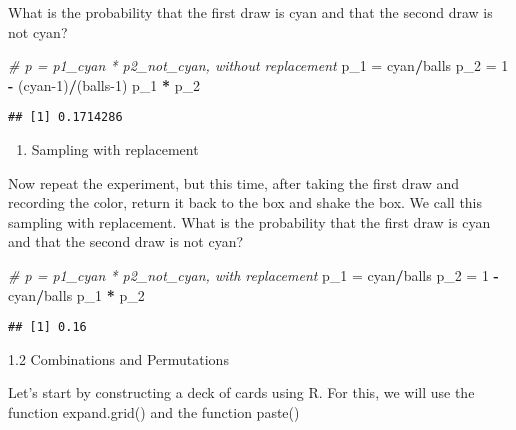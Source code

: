 \documentclass[
]{article}
\newenvironment{Shaded}{\begin{snugshade}}{\end{snugshade}}
\newcommand{\CommentTok}[1]{\textcolor[rgb]{0.56,0.35,0.01}{\textit{#1}}}
\newcommand{\DecValTok}[1]{\textcolor[rgb]{0.00,0.00,0.81}{#1}}
\newcommand{\NormalTok}[1]{#1}
\newcommand{\OperatorTok}[1]{\textcolor[rgb]{0.81,0.36,0.00}{\textbf{#1}}}
\newcommand{\StringTok}[1]{\textcolor[rgb]{0.31,0.60,0.02}{#1}}
\providecommand{\tightlist}{%
  \setlength{\itemsep}{0pt}\setlength{\parskip}{0pt}}
\begin{document}
What is the probability that the first draw is cyan and that the second
draw is not cyan?

\begin{Shaded}
\begin{Highlighting}[]
\CommentTok{# p = p1_cyan * p2_not_cyan, without replacement}
\NormalTok{p_}\DecValTok{1}\NormalTok{ =}\StringTok{ }\NormalTok{cyan}\OperatorTok{/}\NormalTok{balls }
\NormalTok{p_}\DecValTok{2}\NormalTok{ =}\StringTok{ }\DecValTok{1} \OperatorTok{-}\StringTok{ }\NormalTok{(cyan}\DecValTok{-1}\NormalTok{)}\OperatorTok{/}\NormalTok{(balls}\DecValTok{-1}\NormalTok{)}
\NormalTok{p_}\DecValTok{1} \OperatorTok{*}\StringTok{ }\NormalTok{p_}\DecValTok{2}
\end{Highlighting}
\end{Shaded}

\begin{verbatim}
## [1] 0.1714286
\end{verbatim}

\begin{enumerate}
\def\labelenumi{\arabic{enumi}.}
\setcounter{enumi}{3}
\tightlist
\item
  Sampling with replacement
\end{enumerate}

Now repeat the experiment, but this time, after taking the first draw
and recording the color, return it back to the box and shake the box. We
call this sampling with replacement. What is the probability that the
first draw is cyan and that the second draw is not cyan?

\begin{Shaded}
\begin{Highlighting}[]
\CommentTok{# p = p1_cyan * p2_not_cyan, with replacement}
\NormalTok{p_}\DecValTok{1}\NormalTok{ =}\StringTok{ }\NormalTok{cyan}\OperatorTok{/}\NormalTok{balls}
\NormalTok{p_}\DecValTok{2}\NormalTok{ =}\StringTok{ }\DecValTok{1} \OperatorTok{-}\StringTok{ }\NormalTok{cyan}\OperatorTok{/}\NormalTok{balls}
\NormalTok{p_}\DecValTok{1} \OperatorTok{*}\StringTok{ }\NormalTok{p_}\DecValTok{2}
\end{Highlighting}
\end{Shaded}

\begin{verbatim}
## [1] 0.16
\end{verbatim}

1.2 Combinations and Permutations

Let's start by constructing a deck of cards using R. For this, we will
use the function expand.grid() and the function paste()
\end{document}
